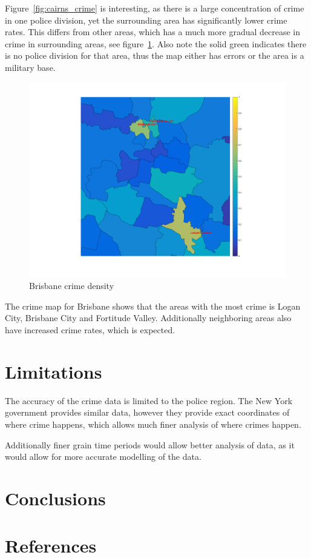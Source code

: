 \documentclass[]{article}
\begin{document}
Figure~\ref{fig:cairns_crime} is interesting, as there is a large concentration of crime in one police division,
yet the surrounding area has significantly lower crime rates.
This differs from other areas, which has a much more gradual decrease in crime in surrounding areas, see figure~\ref{fig:brisbane_crime}.
Also note the solid green indicates there is no police division for that area, thus the map either has errors
or the area is a military base.

\begin{figure}[H]
    \caption{Brisbane crime density}
    \centering
    \label{fig:brisbane_crime}
    \includegraphics[width=\linewidth]{../images/brisbane_crime}
\end{figure}

The crime map for Brisbane shows that the areas with the most crime is Logan City, Brisbane City and Fortitude Valley.
Additionally neighboring areas also have increased crime rates, which is expected.

\section{Limitations}

The accuracy of the crime data is limited to the police region.
The New York government provides similar data, however they provide exact coordinates
of where crime happens, which allows much finer analysis of where crimes happen.

Additionally finer grain time periods would allow better analysis of data, as it would allow for more
accurate modelling of the data.


\section{Conclusions}



\section{References}



\end{document}
